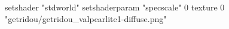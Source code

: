 setshader "stdworld"
setshaderparam "specscale" 0
texture 0 "getridou/getridou_valpearlite1-diffuse.png"